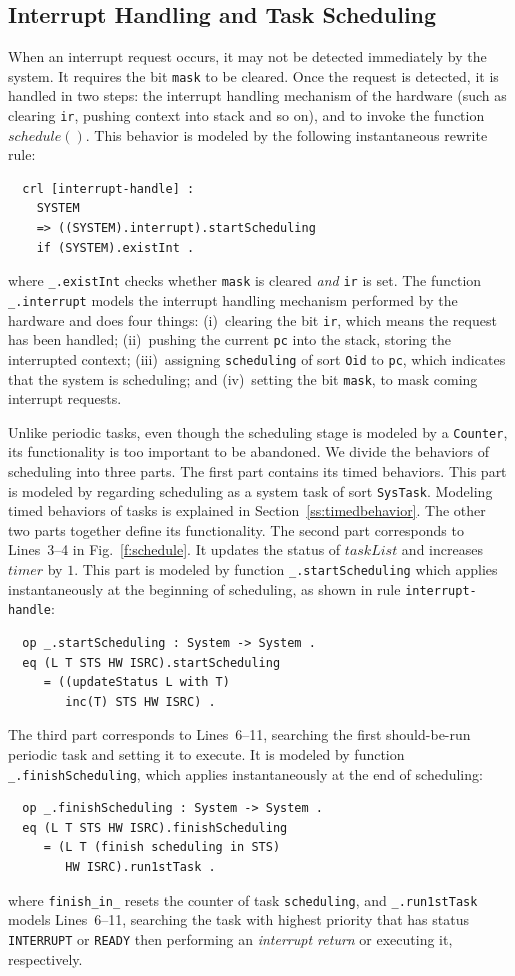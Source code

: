 \documentclass[12pt,onecolumn]{IEEEtranTIE}
\begin{document}
\subsection{Interrupt Handling and Task Scheduling}
\label{ss:inthandling}
When an interrupt request occurs, it may not be detected immediately
by the system. It requires the bit \verb|mask| to be cleared. Once the
request is detected, it is handled in two steps: the interrupt
handling mechanism of the hardware (such as clearing \verb|ir|,
pushing context into stack and so on), and to invoke the function
$\mathit{schedule()}$. This behavior is modeled by the following
instantaneous rewrite rule:
\begin{verbatim}
  crl [interrupt-handle] :
    SYSTEM 
    => ((SYSTEM).interrupt).startScheduling
    if (SYSTEM).existInt .
\end{verbatim}
where \verb|_.existInt| checks whether \verb|mask| is cleared
\emph{and} \verb|ir| is set. The function \verb|_.interrupt| models
the interrupt handling mechanism performed by the hardware and does
four things: (i)~clearing the bit \verb|ir|, which means the request
has been handled; (ii)~pushing the current \verb|pc| into the stack,
storing the interrupted context; (iii)~assigning \verb|scheduling| of
sort \verb|Oid| to \verb|pc|, which indicates that the system is
scheduling; and (iv)~setting the bit \verb|mask|, to mask coming
interrupt requests.

Unlike periodic tasks, even though the scheduling stage is modeled by
a \verb|Counter|, its functionality is too important to be abandoned.
We divide the behaviors of scheduling into three parts.  The first
part contains its timed behaviors. This part is modeled by regarding
scheduling as a system task of sort \verb|SysTask|. Modeling timed
behaviors of tasks is explained in Section~\ref{ss:timedbehavior}.
The other two parts together define its functionality. The second part
corresponds to Lines~3--4 in Fig.~\ref{f:schedule}. It updates the
status of $\mathit{taskList}$ and increases $\mathit{timer}$ by
$1$. This part is modeled by function \verb|_.startScheduling| which
applies instantaneously at the beginning of scheduling, as shown in
rule \verb|interrupt-handle|:
\begin{verbatim}
  op _.startScheduling : System -> System .
  eq (L T STS HW ISRC).startScheduling 
     = ((updateStatus L with T) 
        inc(T) STS HW ISRC) .
\end{verbatim}
The third part corresponds to Lines~6--11, searching the first
should-be-run periodic task and setting it to execute. It is modeled
by function \verb|_.finishScheduling|, which applies instantaneously
at the end of scheduling:
\begin{verbatim}
  op _.finishScheduling : System -> System .
  eq (L T STS HW ISRC).finishScheduling
     = (L T (finish scheduling in STS) 
        HW ISRC).run1stTask .
\end{verbatim}
where \verb|finish_in_| resets the counter of task \verb|scheduling|,
and \verb|_.run1stTask| models Lines~6--11,
searching the task with highest priority that has status
\verb|INTERRUPT| or \verb|READY| then performing an \emph{interrupt
  return} or executing it, respectively.
\end{document}
